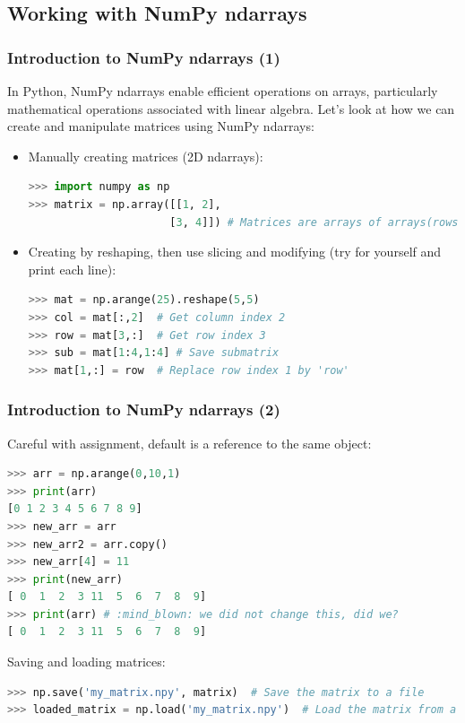 \subsection*{Working with NumPy ndarrays}
\begin{frame}[fragile]
  \frametitle{Introduction to NumPy ndarrays (1)}
  In Python, NumPy ndarrays enable efficient operations on arrays, particularly mathematical operations associated with linear algebra. Let's look at how we can create and manipulate matrices using NumPy ndarrays:\pause
  
  \begin{itemize}
    \item Manually creating matrices (2D ndarrays):
    \begin{lstlisting}[language=Python, numbers=none]
>>> import numpy as np
>>> matrix = np.array([[1, 2], 
                      [3, 4]]) # Matrices are arrays of arrays(rows)
    \end{lstlisting}\pause

    \item Creating by reshaping, then use slicing and modifying (try for yourself and print each line):
    \begin{lstlisting}[language=Python, numbers=none]
>>> mat = np.arange(25).reshape(5,5)
>>> col = mat[:,2]  # Get column index 2
>>> row = mat[3,:]  # Get row index 3
>>> sub = mat[1:4,1:4] # Save submatrix
>>> mat[1,:] = row  # Replace row index 1 by 'row'
    \end{lstlisting}
  \end{itemize}
\end{frame}

\begin{frame}[fragile]
  \frametitle{Introduction to NumPy ndarrays (2)}
  Careful with assignment, default is a reference to the same object:
  \begin{lstlisting}[language=Python, numbers=none]
>>> arr = np.arange(0,10,1)
>>> print(arr)
[0 1 2 3 4 5 6 7 8 9]
>>> new_arr = arr 
>>> new_arr2 = arr.copy()
>>> new_arr[4] = 11
>>> print(new_arr)
[ 0  1  2  3 11  5  6  7  8  9]
>>> print(arr) # :mind_blown: we did not change this, did we?
[ 0  1  2  3 11  5  6  7  8  9]
  \end{lstlisting}\pause

  Saving and loading matrices:
  \begin{lstlisting}[language=Python, numbers=none]
>>> np.save('my_matrix.npy', matrix)  # Save the matrix to a file
>>> loaded_matrix = np.load('my_matrix.npy')  # Load the matrix from a file
  \end{lstlisting}
\end{frame}

